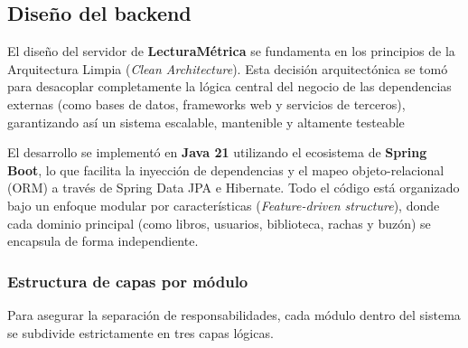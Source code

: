 \documentclass[12pt, atypical, journal]{article}
\begin{document}
\subsection{Diseño del backend}

El diseño del servidor de \textbf{LecturaMétrica} se fundamenta en los principios de la Arquitectura Limpia (\textit{Clean Architecture}). Esta decisión arquitectónica se tomó para desacoplar completamente la lógica central del negocio de las dependencias externas (como bases de datos, frameworks web y servicios de terceros), garantizando así un sistema escalable, mantenible y altamente testeable

El desarrollo se implementó en \textbf{Java 21} utilizando el ecosistema de \textbf{Spring Boot}, lo que facilita la inyección de dependencias y el mapeo objeto-relacional (ORM) a través de Spring Data JPA e Hibernate. 
Todo el código está organizado bajo un enfoque modular por características (\textit{Feature-driven structure}), donde cada dominio principal (como libros, usuarios, biblioteca, rachas y buzón) se encapsula de forma independiente.

\subsubsection{Estructura de capas por módulo}
Para asegurar la separación de responsabilidades, cada módulo dentro del sistema se subdivide estrictamente en tres capas lógicas.
\end{document}
